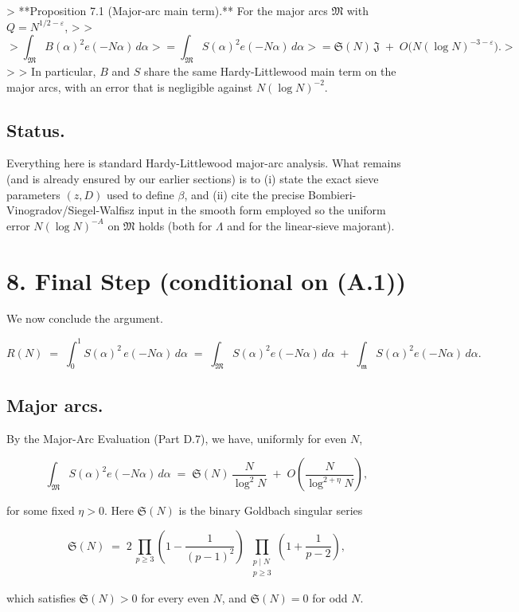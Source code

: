 \documentclass[11pt]{article}
\theoremstyle{definition}
\theoremstyle{remark}
\begin{document}
> **Proposition 7.1 (Major-arc main term).** For the major arcs $\mathfrak M$ with $Q=N^{1/2-\varepsilon}$,
>
> $$
> \int_{\mathfrak M} B(\alpha)^2 e(-N\alpha)\,d\alpha
> =\int_{\mathfrak M} S(\alpha)^2 e(-N\alpha)\,d\alpha
> =\mathfrak S(N)\,\mathfrak J\;+\;O\!\big(N(\log N)^{-3-\varepsilon}\big).
> $$
>
> In particular, $B$ and $S$ share the same Hardy-Littlewood main term on the major arcs, with an error that is negligible against $N(\log N)^{-2}$.

\subsection*{Status.} 
Everything here is standard Hardy-Littlewood major-arc analysis. What remains (and is already ensured by our earlier sections) is to (i) state the exact sieve parameters $(z,D)$ used to define $\beta$, and (ii) cite the precise Bombieri-Vinogradov/Siegel-Walfisz input in the smooth form employed so the uniform error $N(\log N)^{-A}$ on $\mathfrak M$ holds (both for $\Lambda$ and for the linear-sieve majorant).
\section*{8. Final Step (conditional on (A.1))}

We now conclude the argument.

$$
R(N)\;=\;\int_0^1 S(\alpha)^2\,e(-N\alpha)\,d\alpha
\;=\;\int_{\mathfrak M} S(\alpha)^2 e(-N\alpha)\,d\alpha
\;+\;\int_{\mathfrak m} S(\alpha)^2 e(-N\alpha)\,d\alpha.
$$

\subsection*{Major arcs.}

By the Major-Arc Evaluation (Part D.7), we have, uniformly for even $N$,

$$
\int_{\mathfrak M} S(\alpha)^2 e(-N\alpha)\,d\alpha
\;=\;\mathfrak S(N)\,\frac{N}{\log^2 N}\;+\;O\!\left(\frac{N}{\log^{2+\eta}N}\right),
$$

for some fixed $\eta>0$. Here $\mathfrak S(N)$ is the binary Goldbach singular series

$$
\mathfrak S(N)
\;=\;2\,\prod_{p\ge 3}\!\left(1-\frac{1}{(p-1)^2}\right)
\;\prod_{\substack{p\mid N\\ p\ge 3}}\!\!\left(1+\frac{1}{p-2}\right),
$$

which satisfies $\mathfrak S(N)>0$ for every even $N$, and $\mathfrak S(N)=0$ for odd $N$.
\end{document}
